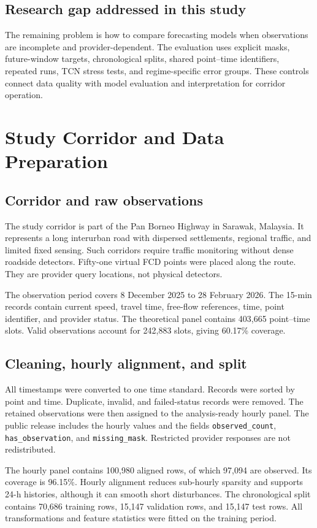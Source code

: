 \documentclass[smallcondensed]{svjour3}
\begin{document}
\subsection{Research gap addressed in this study}
The remaining problem is how to compare forecasting models when observations are incomplete and provider-dependent. The evaluation uses explicit masks, future-window targets, chronological splits, shared point--time identifiers, repeated runs, TCN stress tests, and regime-specific error groups. These controls connect data quality with model evaluation and interpretation for corridor operation.
\section{Study Corridor and Data Preparation}
\subsection{Corridor and raw observations}
The study corridor is part of the Pan Borneo Highway in Sarawak, Malaysia. It represents a long interurban road with dispersed settlements, regional traffic, and limited fixed sensing. Such corridors require traffic monitoring without dense roadside detectors. Fifty-one virtual FCD points were placed along the route. They are provider query locations, not physical detectors.

The observation period covers 8 December 2025 to 28 February 2026. The 15-min records contain current speed, travel time, free-flow references, time, point identifier, and provider status. The theoretical panel contains 403,665 point--time slots. Valid observations account for 242,883 slots, giving 60.17\% coverage.

\subsection{Cleaning, hourly alignment, and split}
All timestamps were converted to one time standard. Records were sorted by point and time. Duplicate, invalid, and failed-status records were removed. The retained observations were then assigned to the analysis-ready hourly panel. The public release includes the hourly values and the fields \texttt{observed\_count}, \texttt{has\_observation}, and \texttt{missing\_mask}. Restricted provider responses are not redistributed.

The hourly panel contains 100,980 aligned rows, of which 97,094 are observed. Its coverage is 96.15\%. Hourly alignment reduces sub-hourly sparsity and supports 24-h histories, although it can smooth short disturbances. The chronological split contains 70,686 training rows, 15,147 validation rows, and 15,147 test rows. All transformations and feature statistics were fitted on the training period.
\end{document}
